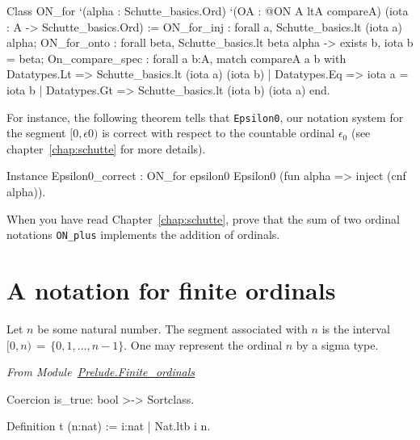 \label{types:ON-for}

\begin{Coqsrc}
Class ON_for `(alpha : Schutte_basics.Ord)
     `(OA : @ON A ltA  compareA)
      (iota : A -> Schutte_basics.Ord) :=
  { ON_for_inj : forall a, Schutte_basics.lt (iota a) alpha;
    ON_for_onto : forall beta, Schutte_basics.lt beta alpha ->
                                exists b, iota b = beta;
    On_compare_spec : forall a b:A,
        match compareA a b with
          Datatypes.Lt => Schutte_basics.lt (iota a) (iota b)
        | Datatypes.Eq => iota a = iota b
        | Datatypes.Gt => Schutte_basics.lt (iota b) (iota a)
        end}.
\end{Coqsrc}



For instance, the following theorem tells that \texttt{Epsilon0}, our notation system for the segment $[0,\epsilon0)$ is correct with respect to the countable ordinal $\epsilon_0$
(see chapter~\ref{chap:schutte} for more details).


\begin{Coqsrc}
Instance Epsilon0_correct :
  ON_for epsilon0 Epsilon0  (fun alpha => inject (cnf alpha)).
\end{Coqsrc}


\begin{project}
  When you have read Chapter~\ref{chap:schutte}, prove that the sum of two ordinal notations \texttt{ON\_plus} implements the addition of ordinals.
\end{project}


\section{A notation for finite ordinals}


Let $n$ be some natural number. The segment associated with $n$ is the interval 
$[0,n)\,=\,\{0,1,\dots,n-1\}$. 
One may represent the ordinal $n$ by a sigma type.


\vspace{4pt}
\noindent\emph{From Module~\href{../src/html/hydras.Prelude.Finite_ordinals.html}{Prelude.Finite\_ordinals}}

\label{def: Finite-ord-type}
\begin{Coqsrc}
Coercion is_true: bool >-> Sortclass.

Definition t (n:nat) := {i:nat | Nat.ltb i n}.
\end{Coqsrc}

